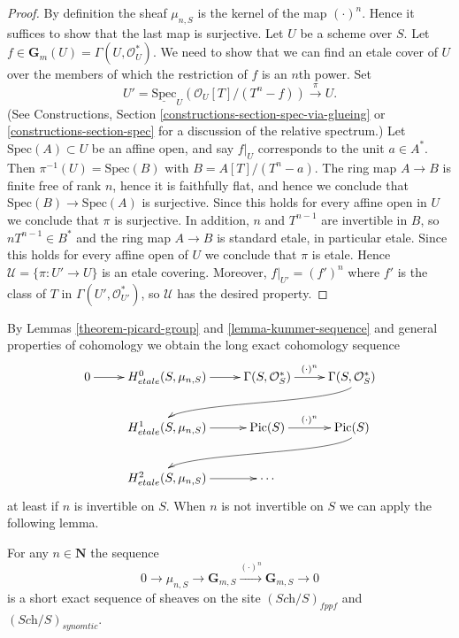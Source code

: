 \begin{proof}
By definition the sheaf $\mu_{n, S}$ is the kernel of the map
$(\cdot)^n$. Hence it suffices to show that the last map is surjective.
Let $U$ be a scheme over $S$. Let
$f \in \mathbf{G}_m(U) = \Gamma(U, \mathcal{O}_U^*)$.
We need to show that we can find an etale cover of
$U$ over the members of which the restriction of $f$ is an $n$th power.
Set
$$
U' =
\underline{\text{Spec}}_U(\mathcal{O}_U[T]/(T^n-f))
\xrightarrow{\pi}
U.
$$
(See
Constructions, Section \ref{constructions-section-spec-via-glueing} or
\ref{constructions-section-spec}
for a discussion of the relative spectrum.)
Let $\text{Spec}(A) \subset U$ be an affine open, and say $f|_U$ corresponds
to the unit $a \in A^*$. Then $\pi^{-1}(U) = \text{Spec}(B)$ with
$B = A[T]/(T^n - a)$. The ring map $A \to B$ is finite free of rank $n$,
hence it is faithfully flat, and hence we conclude that
$\text{Spec}(B) \to \text{Spec}(A)$ is surjective. Since this holds for every
affine open in $U$ we conclude that $\pi$ is surjective.
In addition, $n$ and $T^{n - 1}$ are invertible in $B$, so
$nT^{n-1} \in B^*$ and the ring map $A \to B$ is standard etale,
in particular etale. Since this holds for every affine open of $U$
we conclude that $\pi$ is etale. Hence
$\mathcal{U} = \{\pi : U' \to U\}$ is an etale covering.
Moreover, $f|_{U'} = (f')^n$ where $f'$ is the class of $T$
in $\Gamma(U', \mathcal{O}_{U'}^*)$, so $\mathcal{U}$ has the desired property.
\end{proof}

\noindent
By Lemmas \ref{theorem-picard-group} and \ref{lemma-kummer-sequence}
and general properties of cohomology we obtain
the long exact cohomology sequence
$$
\xymatrix{
0 \ar[r] &
H_{etale}^0(S, \mu_{n, S}) \ar[r] &
\Gamma(S, \mathcal{O}_S^*) \ar^{(\cdot)^n}[r] &
\Gamma(S, \mathcal{O}_S^*) \ar@(rd,ul)[rdllllr]
\\
& H_{etale}^1(S, \mu_{n, S}) \ar[r] &
\text{Pic}(S) \ar^{(\cdot)^n}[r] &
\text{Pic} (S) \ar@(rd,ul)[rdllllr] \\
& H_{etale}^2(S, \mu_{n, S}) \ar[r] &
\cdots
}
$$
at least if $n$ is invertible on $S$. When $n$ is not invertible on $S$
we can apply the following lemma.

\begin{lemma}
\label{lemma-kummer-sequence-syntomic}
For any $n \in \mathbf{N}$ the sequence
$$
0 \to
\mu_{n, S} \to
\mathbf{G}_{m, S} \xrightarrow{(\cdot)^n}
\mathbf{G}_{m, S} \to 0
$$
is a short exact sequence of sheaves on the site
$(\textit{Sch}/S)_{fppf}$ and $(\textit{Sch}/S)_{synomtic}$.
\end{lemma}


